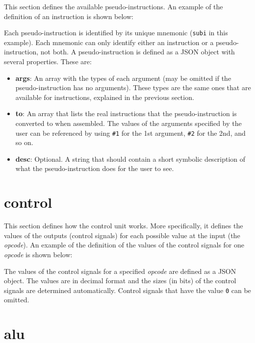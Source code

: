 \documentclass[11pt,a4paper,twoside,titlepage]{report}
\begin{document}
This section defines the available pseudo-instructions.
An example of the definition of an instruction is shown below:



Each pseudo-instruction is identified by its unique mnemonic (\verb+subi+ 
in this example). Each mnemonic can only identify either an instruction or a
pseudo-instruction, not both.
A pseudo-instruction is defined as a JSON object with several properties. 
These are:

\begin{itemize}
	\item \textbf{args}: An array with the types of each argument (may be omitted if
		the pseudo-instruction has no arguments). These types are the same ones that are
		available for instructions, explained in the previous section.
	\item \textbf{to}: An array that lists the real instructions that the
		pseudo-instruction is converted to when assembled. The values of the arguments
		specified by the user can be referenced by using \verb+#1+ for the 1st argument,
		\verb+#2+ for the 2nd, and so on.
	\item \textbf{desc}: Optional. A string that should contain a short symbolic
		description of what the pseudo-instruction does for the user to see.
\end{itemize}


\section{control}

This section defines how the control unit works. More specifically, it
defines the values of the outputs (control signals) for each possible value at
the input (the \emph{opcode}).
An example of the definition of the values of the control signals for one
\emph{opcode} is shown below:



The values of the control signals for a specified \emph{opcode} are defined as
a JSON object. The values are in decimal format and the sizes (in bits) of the 
control signals are determined automatically.
Control signals that have the value \verb+0+ can be omitted.


\section{alu}
\end{document}
